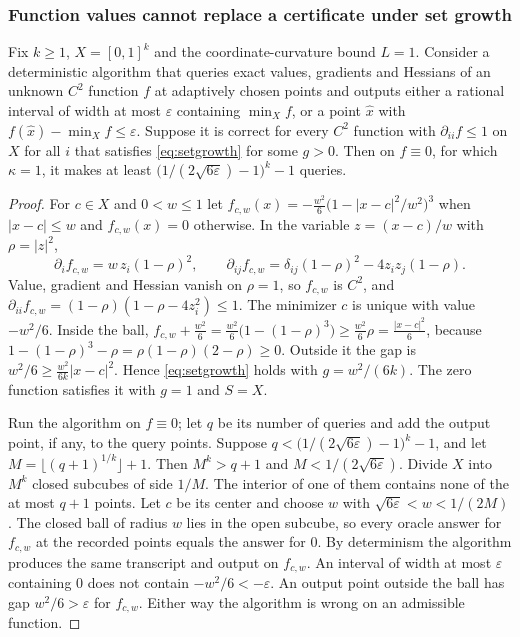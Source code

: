 \subsubsection{Function values cannot replace a certificate under set growth}

\begin{proposition}\label{prop:oraclebarrier}
Fix $k\ge1$, $X=[0,1]^k$ and the coordinate-curvature bound $L=1$. Consider a
deterministic algorithm that queries exact values, gradients and Hessians of
an unknown $C^2$ function $f$ at adaptively chosen points and outputs either a
rational interval of width at most $\varepsilon$ containing $\min_Xf$, or a
point $\hat x$ with $f(\hat x)-\min_Xf\le\varepsilon$. Suppose it is correct
for every $C^2$ function with $\partial_{ii}f\le1$ on $X$ for all $i$ that
satisfies \eqref{eq:setgrowth} for some $g>0$. Then on $f\equiv0$, for which
$\kappa=1$, it makes at least $\bigl(1/(2\sqrt{6\varepsilon})-1\bigr)^k-1$
queries.
\end{proposition}

\begin{proof}
For $c\in X$ and $0<w\le1$ let
$f_{c,w}(x)=-\frac{w^2}6\bigl(1-|x-c|^2/w^2\bigr)^3$ when $|x-c|\le w$ and
$f_{c,w}(x)=0$ otherwise. In the variable $z=(x-c)/w$ with $\rho=|z|^2$,
\[
\partial_if_{c,w}=w\,z_i(1-\rho)^2,\qquad
\partial_{ij}f_{c,w}=\delta_{ij}(1-\rho)^2-4z_iz_j(1-\rho).
\]
Value, gradient and Hessian vanish on $\rho=1$, so $f_{c,w}$ is $C^2$, and
$\partial_{ii}f_{c,w}=(1-\rho)(1-\rho-4z_i^2)\le1$. The minimizer $c$ is
unique with value $-w^2/6$. Inside the ball,
$f_{c,w}+\frac{w^2}6=\frac{w^2}6\bigl(1-(1-\rho)^3\bigr)\ge\frac{w^2}6\rho
=\frac{|x-c|^2}6$, because $1-(1-\rho)^3-\rho=\rho(1-\rho)(2-\rho)\ge0$.
Outside it the gap is $w^2/6\ge\frac{w^2}{6k}|x-c|^2$. Hence
\eqref{eq:setgrowth} holds with $g=w^2/(6k)$. The zero function satisfies it
with $g=1$ and $S=X$.

Run the algorithm on $f\equiv0$; let $q$ be its number of queries and add
the output point, if any, to the query points. Suppose
$q<\bigl(1/(2\sqrt{6\varepsilon})-1\bigr)^k-1$, and let
$M=\lfloor(q+1)^{1/k}\rfloor+1$. Then $M^k>q+1$ and $M<1/(2\sqrt{6\varepsilon})$.
Divide $X$ into $M^k$ closed subcubes of side $1/M$. The interior of one of
them contains none of the at most $q+1$ points. Let $c$ be its center and
choose $w$ with $\sqrt{6\varepsilon}<w<1/(2M)$. The closed ball of radius $w$
lies in the open subcube, so every oracle answer for $f_{c,w}$ at the
recorded points equals the answer for $0$. By determinism the algorithm
produces the same transcript and output on $f_{c,w}$. An interval of width at
most $\varepsilon$ containing $0$ does not contain $-w^2/6<-\varepsilon$. An
output point outside the ball has gap $w^2/6>\varepsilon$ for $f_{c,w}$.
Either way the algorithm is wrong on an admissible function.
\end{proof}

